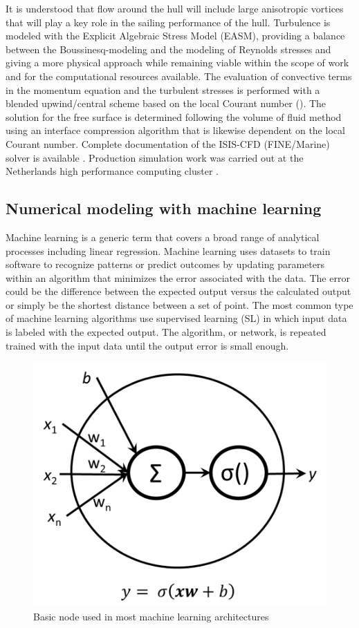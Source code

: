 \documentclass[twoside,twocolumn]{article}
\begin{document}
It is understood that flow around the hull will include large anisotropic vortices that will play a key role in the sailing performance of the hull. Turbulence is modeled with the Explicit Algebraic Stress Model (EASM), providing a balance between the Boussinesq-modeling and the modeling of Reynolds stresses and giving a more physical approach while remaining viable within the scope of work and for the computational resources available. The evaluation of convective terms in the momentum equation and the turbulent stresses is performed with a blended upwind/central scheme based on the local Courant number (\Co). The solution for the free surface is determined following the volume of fluid method using an interface compression algorithm that is likewise dependent on the local Courant number. Complete documentation of the ISIS-CFD (FINE/Marine) solver is available \cite{Numeca1}. Production simulation work was carried out at the Netherlands high performance computing cluster \cite{SARA1}.

\subsection{Numerical modeling with machine learning}

Machine learning is a generic term that covers a broad range of analytical processes including linear regression. Machine learning uses datasets to train software to recognize patterns or predict outcomes by updating parameters within an algorithm that minimizes the error associated with the data. The error could be the difference between the expected output versus the calculated output or simply be the shortest distance between a set of point. The most common type of machine learning algorithms use supervised learning (SL) in which input data is labeled with the expected output. The algorithm, or network, is repeated trained with the input data until the output error is small enough.

\begin{figure}[!h]
	\centering
	\includegraphics[width=.7\columnwidth]{images/node.png}  %
	\caption{Basic node used in most machine learning architectures }
	\label{fig:node}
\end{figure}
\end{document}
